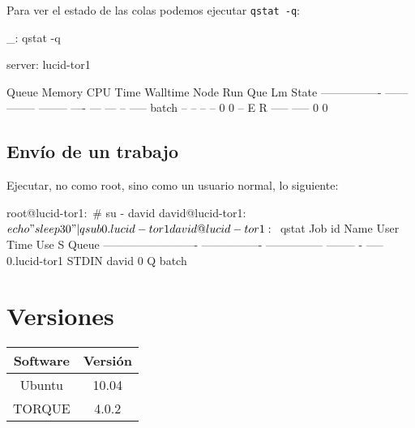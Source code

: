 Para ver el estado de las colas podemos ejecutar \texttt{qstat -q}:

\begin{bashcode}
_: qstat -q

server: lucid-tor1

Queue            Memory CPU Time Walltime Node  Run Que Lm  State
---------------- ------ -------- -------- ----  --- --- --  -----
batch              --      --       --      --    0   0 --   E R
                                               ----- -----
                                                   0     0
\end{bashcode}


\subsection{Envío de un trabajo}

Ejecutar, no como root, sino como un usuario normal, lo siguiente:

\begin{bashcode}
root@lucid-tor1:~# su - david
david@lucid-tor1:~$ echo "sleep 30" | qsub
0.lucid-tor1
david@lucid-tor1:~$ qstat
Job id                    Name             User            Time Use S Queue
------------------------- ---------------- --------------- -------- - -----
0.lucid-tor1               STDIN            david                  0 Q batch
\end{bashcode}


\section{Versiones}

\begin{tabular}{|c|c|}
   \hline
   Software & Versión \\ \hline
   Ubuntu & 10.04 \\ \hline
   TORQUE & 4.0.2 \\ \hline
\end{tabular}
